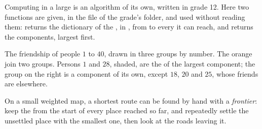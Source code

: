 Computing  in a large  is an algorithm of its own, written in grade 12. Here two functions are given,
in the file  of the grade's folder, and used without reading them: 
returns the dictionary of the , in , from  to every  it can reach, and
 returns the components, largest first.

\label{lst:g10:graphs-first-look:components}

\label{out:g10:graphs-first-look:components}

\begin{omfigure}
\begin{tikzpicture}[scale=0.82, transform shape]
  
\end{tikzpicture}

{\small The friendship  of people $1$ to $40$, drawn in three groups by number. The orange  join two
groups. Persons $1$ and $28$, shaded, are the  of the largest component; the group on the right is a
component of its own, except $18$, $20$ and $25$, whose friends are elsewhere.}
\end{omfigure}

On a small weighted map, a shortest route can be found by hand with a \emph{frontier}: keep the  from the
start of every place reached so far, and repeatedly settle the unsettled place with the smallest one, then look at
the roads leaving it.

